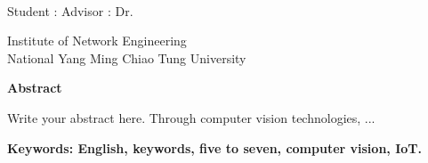  \begin{center}
  	\large
  	\begin{singlespace}
  		\textbf{\englishTitle{}} \\[0.5cm]
  	\end{singlespace}
  	
  	\begin{singlespace}

  			Student : \studentEnName{}  \hspace{1.0cm} Advisor  : Dr.\, \advisorEnName \\
  			[0.5cm]

  	\end{singlespace}
  	
  	\begin{singlespace}
  		Institute of Network Engineering\\
  		National Yang Ming Chiao Tung University\\[0.5cm]
  	\end{singlespace}
  	\textbf{Abstract} \\[0.5cm]
  	
  \end{center}
  \normalsize 
  
Write your abstract here. Through computer vision technologies, ...


\vspace{1cm}

\textbf{Keywords: English, keywords, five to seven, computer vision, IoT.} 
  
